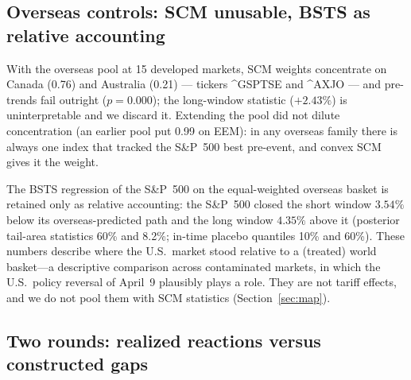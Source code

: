 \documentclass[11pt,a4paper]{article}
\begin{document}
\subsection{Overseas controls: SCM unusable, BSTS as relative accounting}
\label{sec:overseas}

With the overseas pool at 15 developed markets, SCM weights concentrate on
Canada (0.76) and Australia (0.21) --- tickers \^{}GSPTSE and \^{}AXJO ---
and pre-trends fail outright ($p=0.000$); the long-window statistic
($+2.43\%$) is uninterpretable and we discard it. Extending the pool did not dilute
concentration (an earlier pool put 0.99 on EEM): in any overseas family
there is always one index that tracked the S\&P~500 best pre-event, and
convex SCM gives it the weight.

The BSTS regression of the S\&P~500 on the equal-weighted overseas basket
is retained only as relative accounting: the S\&P~500 closed the short
window $3.54\%$ below its overseas-predicted path and the long window
$4.35\%$ above it (posterior tail-area statistics 60\% and 8.2\%; in-time
placebo quantiles 10\% and 60\%). These numbers describe where the U.S.\
market stood relative to a (treated) world basket---a descriptive
comparison across contaminated markets, in which the U.S.\ policy reversal
of April~9 plausibly plays a role. They are not tariff effects, and we do
not pool them with SCM statistics (Section~\ref{sec:map}).

\subsection{Two rounds: realized reactions versus constructed gaps}
\label{sec:tworound}
\end{document}
